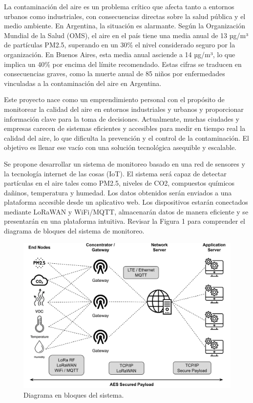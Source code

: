 \documentclass[
11pt, %
]{charter}
\begin{document}
La contaminación del aire es un problema crítico que afecta tanto a entornos urbanos como industriales, con consecuencias directas sobre la salud pública y el medio ambiente. En Argentina, la situación es alarmante. Según la Organización Mundial de la Salud (OMS), el aire en el país tiene una media anual de 13 µg/m³ de partículas PM2.5, superando en un 30\% el nivel considerado seguro por la organización. En Buenos Aires, esta media anual asciende a 14 µg/m³, lo que implica un 40\% por encima del límite recomendado. Estas cifras se traducen en consecuencias graves, como la muerte anual de 85 niños por enfermedades vinculadas a la contaminación del aire en Argentina.

Este proyecto nace como un emprendimiento personal con el propósito de monitorear la calidad del aire en entornos industriales y urbanos y proporcionar información clave para la toma de decisiones. Actualmente, muchas ciudades y empresas carecen de sistemas eficientes y accesibles para medir en tiempo real la calidad del aire, lo que dificulta la prevención y el control de la contaminación. El objetivo es llenar ese vacío con una solución tecnológica asequible y escalable.

Se propone desarrollar un sistema de monitoreo basado en una red de sensores y la tecnología internet de las cosas (IoT). El sistema será capaz de detectar partículas en el aire tales como PM2.5, niveles de CO2, compuestos químicos dañinos, temperatura y humedad. Los datos obtenidos serán enviados a una plataforma accesible desde un aplicativo web. Los dispositivos estarán conectados mediante LoRaWAN y WiFi/MQTT, almacenarán datos de manera eficiente y se presentarán en una plataforma intuitiva. Revisar la Figura 1 para comprender el diagrama de bloques del sistema de monitoreo.

\begin{figure}[htpb]
\centering 
\includegraphics[width=.65\textwidth]{./Figuras/fig_1-diagBloques.png}
\caption{Diagrama en bloques del sistema.}
\label{fig:diagBloques}
\end{figure}
\end{document}
